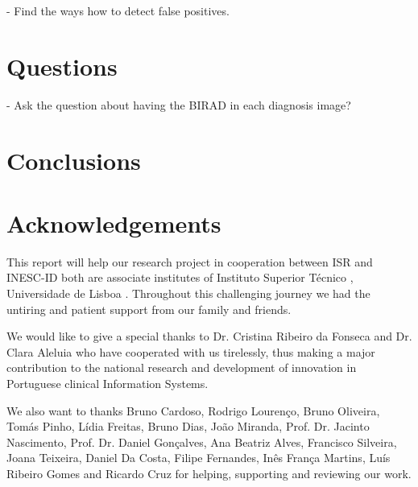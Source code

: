 - Find the ways how to detect false positives.

\section{Questions}

- Ask the question about having the BIRAD in each diagnosis image?

\clearpage

\section{Conclusions}

\clearpage

\section{Acknowledgements}

This report will help our research project in cooperation between ISR \cite{isr} and INESC-ID \cite{inescid} both are associate institutes of Instituto Superior T\'{e}cnico \cite{ist}, Universidade de Lisboa \cite{ul}. Throughout this challenging journey we had the untiring and patient support from our family and friends.

We would like to give a special thanks to Dr. Cristina Ribeiro da Fonseca and Dr. Clara Aleluia who have cooperated with us tirelessly, thus making a major contribution to the national research and development of innovation in Portuguese clinical Information Systems.

We also want to thanks Bruno Cardoso, Rodrigo Louren\c{c}o, Bruno Oliveira, Tom\'{a}s Pinho, L\'{i}dia Freitas, Bruno Dias, Jo\~{a}o Miranda, Prof. Dr. Jacinto Nascimento, Prof. Dr. Daniel Gon\c{c}alves, Ana Beatriz Alves, Francisco Silveira, Joana Teixeira, Daniel Da Costa, Filipe Fernandes, In\^{e}s Fran\c{c}a Martins, Lu\'{i}s Ribeiro Gomes and Ricardo Cruz for helping, supporting and reviewing our work.

\clearpage

\printbibliography


